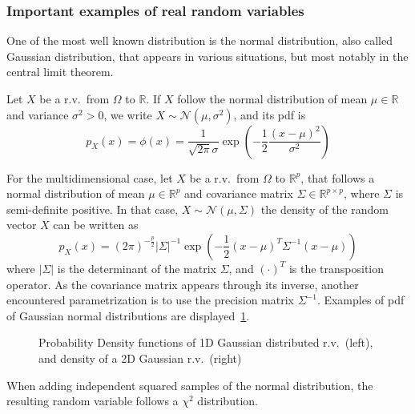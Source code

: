 \documentclass[../../Main_ManuscritThese.tex]{subfiles}
\newcommand\imgpath{/home/victor/acadwriting/Manuscrit/Text/Chapter2/img/}
\begin{document}
\subsubsection{Important examples of real random variables}
One of the most well known distribution is the normal distribution, also called Gaussian distribution, that appears in various situations, but most notably in the central limit theorem.
\begin{example}
  \label{ex:gaussian_distribution}
  Let $X$ be a r.v.\ from $\Omega$ to $\mathbb{R}$.
  If $X$ follow the normal distribution of mean $\mu \in \mathbb{R}$ and variance $\sigma^2>0$, we write $X \sim \mathcal{N}(\mu,\sigma^2)$, and its pdf is
  \begin{equation}
    p_X(x) = \phi(x) = \frac{1}{\sqrt{2\pi}\sigma}\exp\left(-\frac{1}{2}\frac{(x-\mu)^2}{\sigma^2}\right)
  \end{equation}

For the multidimensional case, let $X$ be a r.v.\ from $\Omega$ to $\mathbb{R}^p$, that follows a normal distribution of mean $\mu \in \mathbb{R}^p$ and covariance matrix $\Sigma \in \mathbb{R}^{p\times p}$, where $\Sigma$ is semi-definite positive.
In that case, $X\sim \mathcal{N}(\mu, \Sigma)$ the density of the random vector $X$ can be written as
\begin{equation}
    p_X(x) = (2\pi)^{-\frac{p}{2}}\lvert\Sigma\rvert^{-1}\exp\left(-\frac{1}{2}(x-\mu)^T\Sigma^{-1}(x-\mu)\right)
  \end{equation}
  where $|\Sigma|$ is the determinant of the matrix $\Sigma$, and $(\cdot)^T$ is the transposition operator.
  As the covariance matrix appears through its inverse, another encountered parametrization is to use the precision matrix $\Sigma^{-1}$.
  Examples of pdf of Gaussian normal distributions are displayed~\cref{fig:example_normal}.
\end{example}
\begin{figure}[!h]
  \centering
  
  \caption[Probability Density functions of 1D Gaussian distributed r.v.\ (left), and density of a 2D Gaussian r.v.\ (right)]{Probability Density functions of 1D Gaussian distributed r.v.\ (left), and density of a 2D Gaussian r.v.\ (right)}
  \label{fig:example_normal}
\end{figure}
When adding independent squared samples of the normal distribution, the resulting random variable follows a $\chi^2$ distribution.
\end{document}
